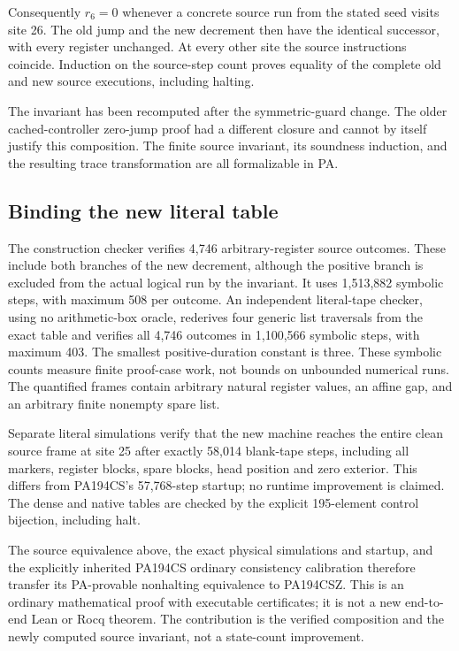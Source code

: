 Consequently $r_6=0$ whenever a concrete source run from the stated seed
visits site 26. The old jump and the new decrement then have the identical
successor, with every register unchanged. At every other site the source
instructions coincide. Induction on the source-step count proves equality
of the complete old and new source executions, including halting.

The invariant has been recomputed after the symmetric-guard change.
The older cached-controller zero-jump proof had a different closure and
cannot by itself justify this composition. The finite source invariant,
its soundness induction, and the resulting trace transformation are all
formalizable in PA.

\subsection{Binding the new literal table}
The construction checker verifies 4,746 arbitrary-register source
outcomes. These include both branches of the new decrement, although the
positive branch is excluded from the actual logical run by the invariant.
It uses 1,513,882 symbolic steps, with maximum 508 per outcome.
An independent literal-tape checker, using no arithmetic-box oracle,
rederives four generic list traversals from the exact table and verifies
all 4,746 outcomes in 1,100,566 symbolic steps, with maximum 403. The
smallest positive-duration constant is three. These symbolic counts
measure finite proof-case work, not bounds on unbounded numerical runs.
The quantified frames contain arbitrary natural register values, an
affine gap, and an arbitrary finite nonempty spare list.

Separate literal simulations verify that the new machine reaches the
entire clean source frame at site 25 after exactly 58,014 blank-tape
steps, including all markers, register blocks, spare blocks, head
position and zero exterior. This differs from PA194CS's 57,768-step
startup; no runtime improvement is claimed. The dense and native tables
are checked by the explicit 195-element control bijection, including halt.

The source equivalence above, the exact physical simulations and startup,
and the explicitly inherited PA194CS ordinary consistency calibration
therefore transfer its PA-provable nonhalting equivalence to PA194CSZ.
This is an ordinary mathematical proof with executable certificates;
it is not a new end-to-end Lean or Rocq theorem. The contribution is the
verified composition and the newly computed source invariant, not a
state-count improvement.
